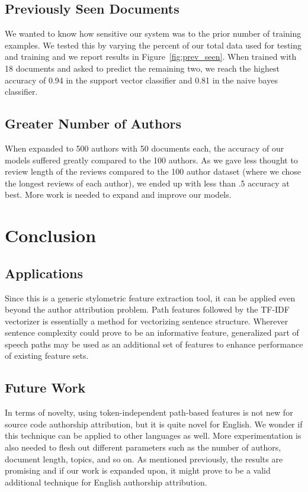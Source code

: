 \documentclass[11pt,a4paper]{article}
\begin{document}
\subsection{Previously Seen Documents}

We wanted to know how sensitive our system was to the prior number of training examples. We tested this by varying the percent of our total data used for testing and training and we report results in Figure~\ref{fig:prev_seen}. When trained with 18 documents and asked to predict the remaining two, we reach the highest accuracy of 0.94 in the support vector classifier and 0.81 in the naive bayes classifier.

\subsection{Greater Number of Authors}

When expanded to 500 authors with 50 documents each, the accuracy of our models suffered greatly compared to the 100 authors. As we gave less thought to review length of the reviews compared to the 100 author dataset (where we chose the longest reviews of each author), we ended up with less than .5 accuracy at best. More work is needed to expand and improve our models.

\section{Conclusion}

\subsection{Applications}

Since this is a generic stylometric feature extraction tool, it can be applied even beyond the author attribution problem. Path features followed by the TF-IDF vectorizer is essentially a method for vectorizing sentence structure. Wherever sentence complexity could prove to be an informative feature, generalized part of speech paths may be used as an additional set of features to enhance performance of existing feature sets. 

\subsection{Future Work}

In terms of novelty, using token-independent path-based features is not new for source code authorship attribution, but it is quite novel for English. We wonder if this technique can be applied to other languages as well. More experimentation is also needed to flesh out different parameters such as the number of authors, document length, topics, and so on. As mentioned previously, the results are promising and if our work is expanded upon, it might prove to be a valid additional technique for English authorship attribution. 
\end{document}
